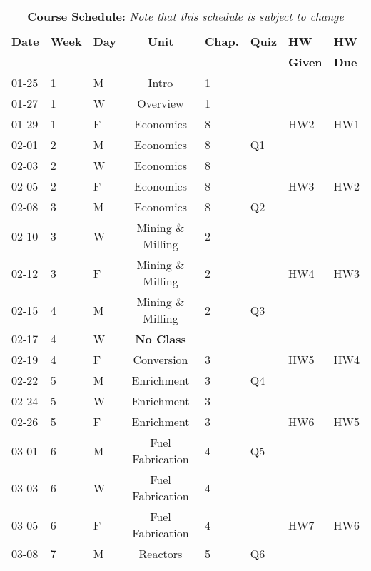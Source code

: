 \documentclass[11pt, a4paper]{article}
\begin{document}
\pagebreak
\FloatBarrier
\renewcommand{\arraystretch}{1}
\begin{table}[h]
\begin{center}
\begin{tabular}{lllcllll}
\multicolumn{8}{c}{\textbf{Course Schedule:}\textit{ Note that this schedule is subject to change}}\\
&&&&&&&\\
\textbf{Date} & \textbf{Week} & \textbf{Day} & \textbf{Unit} & \textbf{Chap.} & \textbf{Quiz} & \textbf{HW} & \textbf{HW}\\
 &  &  &  &  &                                                                                          & \textbf{Given} & \textbf{Due}\\
\hline
\hline
01-25 & 1 & M & Intro      & 1 &           &      &    \\
01-27 & 1 & W & Overview   & 1 &           &      &    \\
01-29 & 1 & F & Economics  & 8 &           &  HW2 & HW1\\
02-01 & 2 & M & Economics  & 8 &        Q1 &      &    \\
02-03 & 2 & W & Economics  & 8 &           &      &    \\
02-05 & 2 & F & Economics  & 8 &           &  HW3 & HW2\\
02-08 & 3 & M & Economics  & 8 &        Q2 &      &    \\
02-10 & 3 & W & Mining \& Milling & 2 &    &      &    \\
02-12 & 3 & F & Mining \& Milling & 2 &    &  HW4 & HW3\\
02-15 & 4 & M & Mining \& Milling & 2 & Q3 &      &    \\
02-17 & 4 & W & \textbf{No Class} &  &    &      &    \\
02-19 & 4 & F & Conversion & 3 &           &  HW5 & HW4\\
02-22 & 5 & M & Enrichment & 3 &        Q4 &      &    \\
02-24 & 5 & W & Enrichment & 3 &           &      &    \\
02-26 & 5 & F & Enrichment & 3 &           &  HW6 & HW5\\
03-01 & 6 & M & Fuel Fabrication & 4 &  Q5 &      &    \\
03-03 & 6 & W & Fuel Fabrication & 4 &     &      &    \\
03-05 & 6 & F & Fuel Fabrication & 4 &     &  HW7 & HW6\\
03-08 & 7 & M & Reactors & 5 &          Q6 &      &    \\

\end{tabular}
\end{center}
\end{table}
\end{document}
